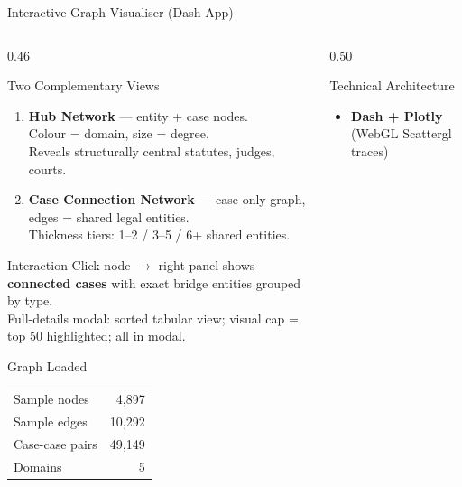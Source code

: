 \documentclass[aspectratio=169, 9pt]{beamer}
\begin{document}
\begin{frame}{Interactive Graph Visualiser (Dash App)}
  \begin{columns}[T]
    \begin{column}{0.46\textwidth}
      \begin{block}{Two Complementary Views}
        \small
        \begin{enumerate}\setlength\itemsep{4pt}
          \item \textbf{Hub Network} — entity + case nodes.\\
                Colour = domain, size = degree.\\
                Reveals structurally central statutes, judges, courts.
          \item \textbf{Case Connection Network} — case-only graph, edges = shared legal entities.\\
                Thickness tiers: 1--2 / 3--5 / 6+ shared entities.
        \end{enumerate}
      \end{block}
      \vspace{5pt}
      \begin{block}{Interaction}
        \small
        Click node $\to$ right panel shows \textbf{connected cases} with exact bridge entities grouped by type.\\[3pt]
        Full-details modal: sorted tabular view; visual cap = top 50 highlighted; all in modal.
      \end{block}
      \vspace{5pt}
      \begin{block}{Graph Loaded}
        \scriptsize\renewcommand{\arraystretch}{1.1}
        \begin{tabular}{lr}
          Sample nodes & 4,897\\
          Sample edges & 10,292\\
          Case-case pairs & 49,149\\
          Domains & 5\\
        \end{tabular}
      \end{block}
    \end{column}
    \begin{column}{0.50\textwidth}
      \begin{block}{Technical Architecture}
        \small
        \begin{itemize}\setlength\itemsep{3pt}
          \item \textbf{Dash + Plotly} (WebGL Scattergl traces)

\end{itemize}
\end{block}
\end{column}
\end{columns}
\end{frame}
\end{document}
